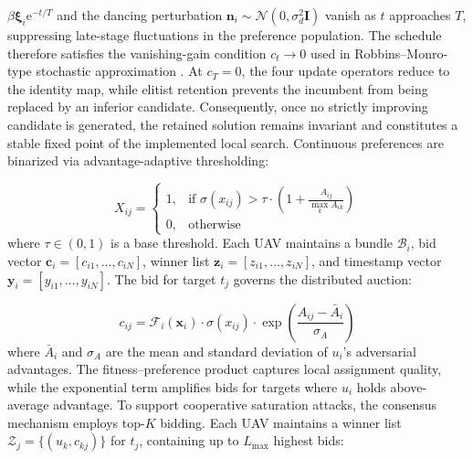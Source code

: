 \documentclass[lettersize,journal]{IEEEtran}
\begin{document}
$\beta\boldsymbol{\xi}_i\mathrm{e}^{-t/T}$ and the dancing perturbation
$\mathbf{n}_i\sim\mathcal{N}(0,\sigma_d^2\mathbf{I})$ vanish as $t$
approaches $T$, suppressing late-stage fluctuations in the preference
population. The schedule therefore satisfies the vanishing-gain condition
$c_t\to0$ used in Robbins--Monro-type stochastic approximation
\cite{robbins1951stochastic}. At $c_T=0$, the four update operators reduce
to the identity map, while elitist retention prevents the incumbent from
being replaced by an inferior candidate. Consequently, once no strictly
improving candidate is generated, the retained solution remains invariant
and constitutes a stable fixed point of the implemented local search.
Continuous preferences are binarized via advantage-adaptive thresholding:

\begin{equation}
\label{eq:thresholding}
X_{ij} = 
\begin{cases}
1, & \text{if } \sigma(x_{ij}) > \tau \cdot \left(1 + \frac{A_{ij}}{\max_k A_{ik}}\right) \\
0, & \text{otherwise}
\end{cases}
\end{equation}
where $\tau \in (0,1)$ is a base threshold. Each UAV maintains a bundle $\mathcal{B}_i$, bid vector $\mathbf{c}_i = [c_{i1}, \dots, c_{iN}]$, winner list $\mathbf{z}_i = [z_{i1}, \dots, z_{iN}]$, and timestamp vector $\mathbf{y}_i = [y_{i1}, \dots, y_{iN}]$. The bid for target $t_j$ governs the distributed auction:

\begin{equation}
\label{eq:bid_formulation}
c_{ij} = \mathcal{F}_i(\mathbf{x}_i) \cdot \sigma(x_{ij}) \cdot \exp\left(\frac{A_{ij} - \bar{A}_i}{\sigma_A}\right)
\end{equation}
where $\bar{A}_i$ and $\sigma_A$ are the mean and standard deviation of $u_i$'s adversarial advantages. The fitness--preference product captures local assignment quality, while the exponential term amplifies bids for targets where $u_i$ holds above-average advantage. To support cooperative saturation attacks, the consensus mechanism employs top-$K$ bidding. Each UAV maintains a winner list $\mathcal{Z}_{j} = \{(u_k, c_{kj})\}$ for $t_j$, containing up to $L_{\max}$ highest bids:
\end{document}
